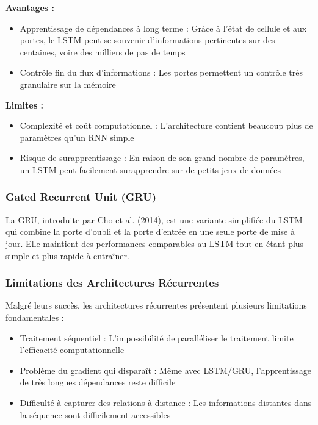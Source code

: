 \textbf{Avantages :}
\begin{itemize}
    \item Apprentissage de dépendances à long terme : Grâce à l'état de cellule et aux portes, le LSTM peut se souvenir d'informations pertinentes sur des centaines, voire des milliers de pas de temps
    \item Contrôle fin du flux d'informations : Les portes permettent un contrôle très granulaire sur la mémoire
\end{itemize}

\textbf{Limites :}
\begin{itemize}
    \item Complexité et coût computationnel : L'architecture contient beaucoup plus de paramètres qu'un RNN simple
    \item Risque de surapprentissage : En raison de son grand nombre de paramètres, un LSTM peut facilement surapprendre sur de petits jeux de données
\end{itemize}

\subsubsection{Gated Recurrent Unit (GRU)}

La GRU, introduite par Cho et al. (2014), est une variante simplifiée du LSTM qui combine la porte d'oubli et la porte d'entrée en une seule porte de mise à jour. Elle maintient des performances comparables au LSTM tout en étant plus simple et plus rapide à entraîner.

\subsubsection{Limitations des Architectures Récurrentes}

Malgré leurs succès, les architectures récurrentes présentent plusieurs limitations fondamentales :
\begin{itemize}
    \item Traitement séquentiel : L'impossibilité de paralléliser le traitement limite l'efficacité computationnelle
    \item Problème du gradient qui disparaît : Même avec LSTM/GRU, l'apprentissage de très longues dépendances reste difficile
    \item Difficulté à capturer des relations à distance : Les informations distantes dans la séquence sont difficilement accessibles
\end{itemize}

